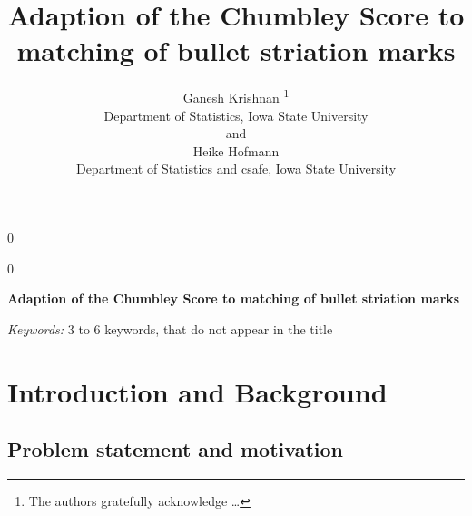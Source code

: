 \documentclass[12pt]{article}
\newcommand{\blind}{0}
\begin{document}
\def\spacingset#1{\renewcommand{\baselinestretch}%
{#1}\small\normalsize} \spacingset{1}



\blind
{
  \title{\bf Adaption of the Chumbley Score to matching of bullet striation marks}

  \author{
        Ganesh Krishnan \thanks{The authors gratefully acknowledge \ldots{}} \\
    Department of Statistics, Iowa State University\\
     and \\     Heike Hofmann \\
    Department of Statistics and csafe, Iowa State University\\
      }
  \maketitle
} \fi

\blind
{
  \bigskip
  \bigskip
  \bigskip
  \begin{center}
    {\LARGE\bf Adaption of the Chumbley Score to matching of bullet striation marks}
  \end{center}
  \medskip
} \fi

\bigskip
\begin{abstract}

\end{abstract}

\noindent%
{\it Keywords:} 3 to 6 keywords, that do not appear in the title
\vfill

\newpage
\spacingset{1.45} %

\newcommand{\hh}[1]{{\textcolor{orange}{#1}}}
\newcommand{\gk}[1]{{\textcolor{green}{#1}}}
\newcommand{\cited}[1]{{\textcolor{red}{#1}}}

\tableofcontents

\section{Introduction and Background}\label{introduction-and-background}

\subsection{Problem statement and
motivation}\label{problem-statement-and-motivation}
\end{document}
